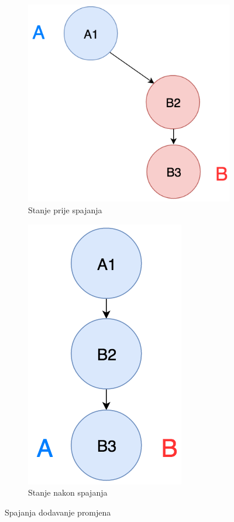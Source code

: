 \documentclass[times, utf8, diplomski, numeric]{fer}
\begin{document}
\begin{figure}[b!]
    \centering
    \begin{subfigure}{.49\textwidth}
        \centering
        \includegraphics[scale=0.6]{FastForwardA}
        \caption{Stanje prije spajanja}
        \label{fig:FastForwardA}
    \end{subfigure}
    \begin{subfigure}{.49\textwidth}
        \centering
        \includegraphics[scale=0.6]{FastForwardB}
        \caption{Stanje nakon spajanja}
        \label{fig:FastForwardB}
    \end{subfigure}
    \caption{Spajanja dodavanje promjena}
    \label{fig:FastForward}
\end{figure}
\end{document}
